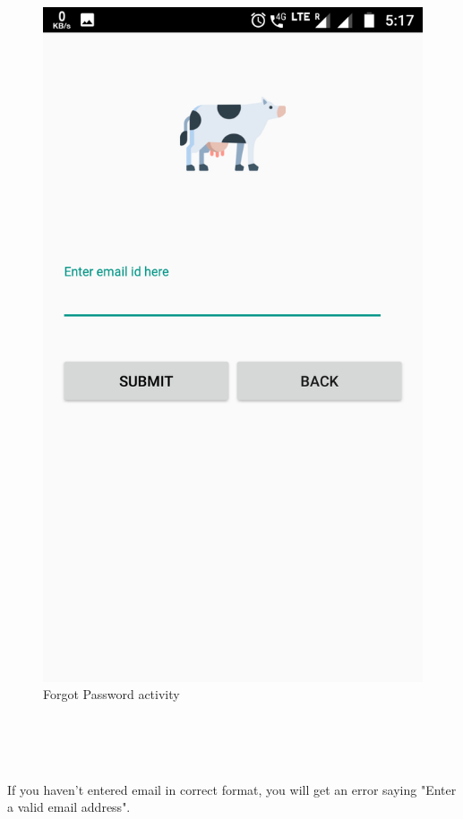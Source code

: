 \begin{figure}[h]
	\centering
	\includegraphics[width=0.7\linewidth]{s03}
	\caption{Forgot Password activity}
\end{figure}
\begin{text}
	\\
	\\
	\\
\end{text}
If you haven't entered email in correct format, you will get an error saying "Enter a valid email address".
